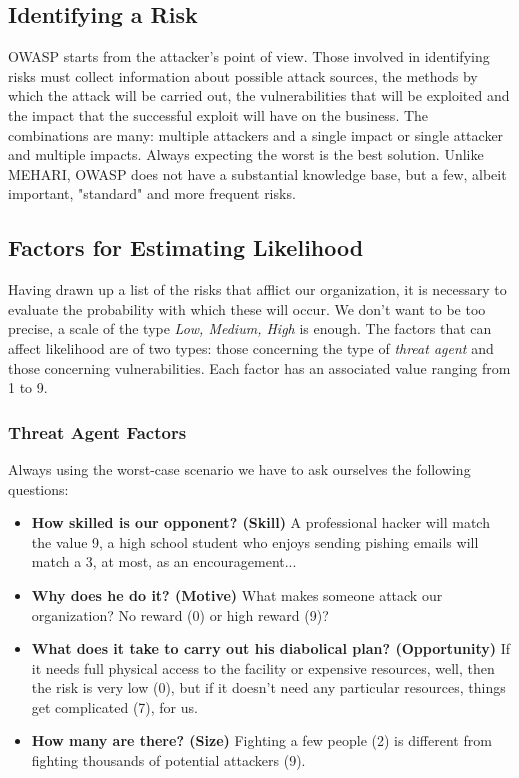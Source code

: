 \subsection{Identifying a Risk}
OWASP starts from the attacker's point of view. Those involved in identifying risks must collect information about possible attack sources, the methods by which the attack will be carried out, the vulnerabilities that will be exploited and the impact that the successful exploit will have on the business. The combinations are many: multiple attackers and a single impact or single attacker and multiple impacts. Always expecting the worst is the best solution. Unlike MEHARI, OWASP does not have a substantial knowledge base, but a few, albeit important, "standard" and more frequent risks.
\subsection{Factors for Estimating Likelihood}
Having drawn up a list of the risks that afflict our organization, it is necessary to evaluate the probability with which these will occur. We don't want to be too precise, a scale of the type \textit{Low, Medium, High} is enough. The factors that can affect likelihood are of two types: those concerning the type of \textit {threat agent} and those concerning vulnerabilities. Each factor has an associated value ranging from 1 to 9.
\subsubsection{Threat Agent Factors}
Always using the worst-case scenario we have to ask ourselves the following questions:
\begin{itemize}
    \itemsep0em
    \item \textbf{How skilled is our opponent? (Skill)} A professional hacker will match the value 9, a high school student who enjoys sending pishing emails will match a 3, at most, as an encouragement...
    \item \textbf{Why does he do it? (Motive)} What makes someone attack our organization? No reward (0) or high reward (9)?
    \item \textbf{What does it take to carry out his diabolical plan? (Opportunity)} If it needs full physical access to the facility or expensive resources, well, then the risk is very low (0), but if it doesn't need any particular resources, things get complicated (7), for us.
    \item \textbf{How many are there? (Size)} Fighting a few people (2) is different from fighting thousands of potential attackers (9).
\end{itemize}
